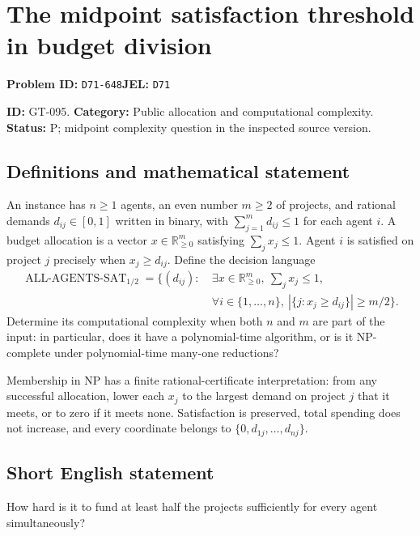 \documentclass[11pt,a4paper]{article}
\begin{document}
\section*{The midpoint satisfaction threshold in budget division}
\textbf{Problem ID:} \texttt{D71-648}\quad \textbf{JEL:} \texttt{D71}\par
\label{problem:OP-0225}
\label{game:GT-095}
{\sffamily\small\color{muted}
\noindent\textbf{ID:} GT-095. \textbf{Category:} Public allocation and computational complexity.
\textbf{Status:} P; midpoint complexity question in the inspected source version.
\par}
\subsection*{Definitions and mathematical statement}
An instance has $n\geq1$ agents, an even number $m\geq2$ of projects, and rational demands
$d_{ij}\in[0,1]$ written in binary, with $\sum_{j=1}^m d_{ij}\leq1$ for each agent $i$. A budget allocation is a vector $x\in\mathbb R_{\geq0}^{m}$ satisfying $\sum_jx_j\leq1$. Agent $i$ is satisfied on project $j$ precisely when $x_j\geq d_{ij}$. Define the decision language
\[
 \begin{split}
 \operatorname{ALL\text{-}AGENTS\text{-}SAT}_{1/2}
 =\{(d_{ij}):\ &\exists x\in\mathbb R_{\geq0}^m,
 \ \sum_jx_j\leq1,\\[-2pt]
 &\forall i\in\{1,\ldots,n\},\
       |\{j:x_j\geq d_{ij}\}|\geq m/2\}.
 \end{split}
\]
Determine its computational complexity when both $n$ and $m$ are part of the input: in particular, does it have a polynomial-time algorithm, or is it NP-complete under polynomial-time many-one reductions?

Membership in NP has a finite rational-certificate interpretation: from any successful allocation, lower each $x_j$ to the largest demand on project $j$ that it meets, or to zero if it meets none. Satisfaction is preserved, total spending does not increase, and every coordinate belongs to $\{0,d_{1j},\ldots,d_{nj}\}$.

\subsection*{Short English statement}
How hard is it to fund at least half the projects sufficiently for every agent simultaneously?
\end{document}
